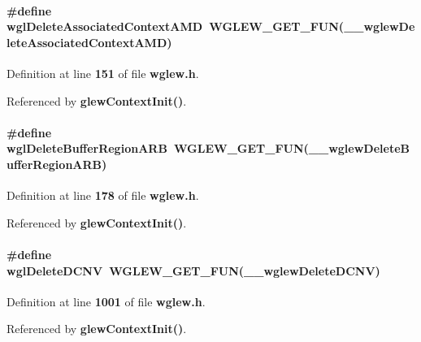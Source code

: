 \paragraph[{wgl\+Delete\+Associated\+Context\+A\+MD}]{\setlength{\rightskip}{0pt plus 5cm}\#define wgl\+Delete\+Associated\+Context\+A\+MD~{\bf W\+G\+L\+E\+W\+\_\+\+G\+E\+T\+\_\+\+F\+UN}({\bf \+\_\+\+\_\+wglew\+Delete\+Associated\+Context\+A\+MD})}\label{wglew_8h_a4bcc647147a904498c6ab4ecb43d9337}


Definition at line {\bf 151} of file {\bf wglew.\+h}.



Referenced by {\bf glew\+Context\+Init()}.

\paragraph[{wgl\+Delete\+Buffer\+Region\+A\+RB}]{\setlength{\rightskip}{0pt plus 5cm}\#define wgl\+Delete\+Buffer\+Region\+A\+RB~{\bf W\+G\+L\+E\+W\+\_\+\+G\+E\+T\+\_\+\+F\+UN}({\bf \+\_\+\+\_\+wglew\+Delete\+Buffer\+Region\+A\+RB})}\label{wglew_8h_a79dd0f5b122ec6611a140c259ce1095e}


Definition at line {\bf 178} of file {\bf wglew.\+h}.



Referenced by {\bf glew\+Context\+Init()}.

\paragraph[{wgl\+Delete\+D\+C\+NV}]{\setlength{\rightskip}{0pt plus 5cm}\#define wgl\+Delete\+D\+C\+NV~{\bf W\+G\+L\+E\+W\+\_\+\+G\+E\+T\+\_\+\+F\+UN}({\bf \+\_\+\+\_\+wglew\+Delete\+D\+C\+NV})}\label{wglew_8h_a72f2fbe4c2b7d97f7346c0b9c75addb4}


Definition at line {\bf 1001} of file {\bf wglew.\+h}.



Referenced by {\bf glew\+Context\+Init()}.


